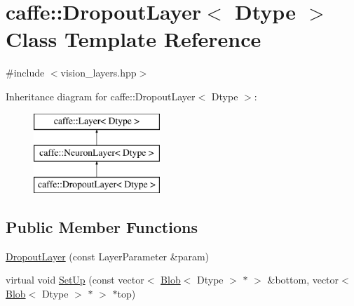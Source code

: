 \hypertarget{classcaffe_1_1_dropout_layer}{\section{caffe\+:\+:Dropout\+Layer$<$ Dtype $>$ Class Template Reference}
\label{classcaffe_1_1_dropout_layer}
}


{\ttfamily \#include $<$vision\+\_\+layers.\+hpp$>$}

Inheritance diagram for caffe\+:\+:Dropout\+Layer$<$ Dtype $>$\+:\begin{figure}[H]
\begin{center}
\leavevmode
\includegraphics[height=3.000000cm]{classcaffe_1_1_dropout_layer}
\end{center}
\end{figure}
\subsection*{Public Member Functions}
\begin{DoxyCompactItemize}
\item 
\hyperlink{classcaffe_1_1_dropout_layer_a24cbddd4699b102a9555d3b8013c16d0}{Dropout\+Layer} (const Layer\+Parameter \&param)
\item 
virtual void \hyperlink{classcaffe_1_1_dropout_layer_a1314d858640aa6ef2453c7cb6209be4e}{Set\+Up} (const vector$<$ \hyperlink{classcaffe_1_1_blob}{Blob}$<$ Dtype $>$ $\ast$ $>$ \&bottom, vector$<$ \hyperlink{classcaffe_1_1_blob}{Blob}$<$ Dtype $>$ $\ast$ $>$ $\ast$top)
\end{DoxyCompactItemize}
